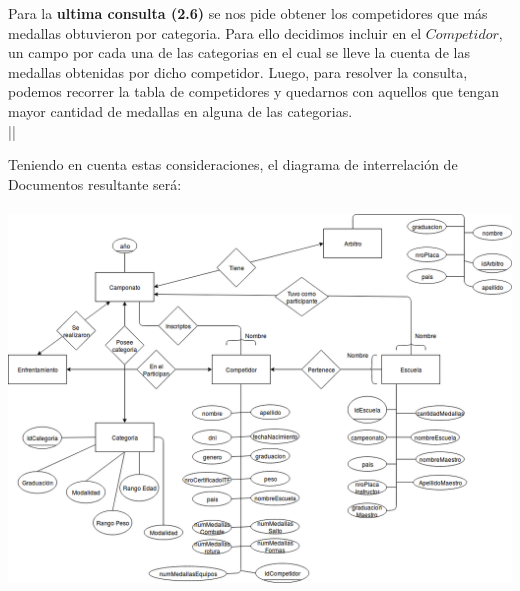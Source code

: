 Para la \textbf{ultima consulta (2.6)} se nos pide obtener los competidores que más 
medallas obtuvieron por categoria. Para ello decidimos incluir en el $Competidor$, un 
campo por cada una de las categorias en el cual se lleve la cuenta de las 
medallas obtenidas por dicho competidor. Luego, para resolver la consulta, 
podemos recorrer la tabla de competidores y quedarnos con aquellos  que 
tengan mayor cantidad de medallas en alguna de las categorias. \\ ||

Teniendo en cuenta estas consideraciones, el diagrama de interrelación de 
Documentos resultante será:\\ \\

\includegraphics[angle=90,scale=0.55]{DID.png}



 


